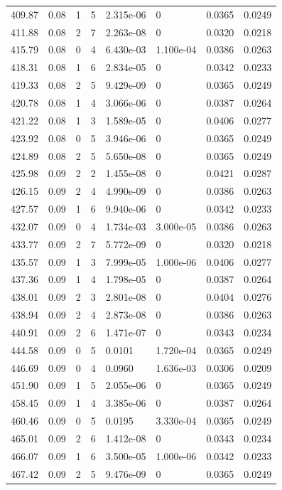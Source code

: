 \documentclass[preview]{standalone}
\begin{document}
{{{{{{\begin{tabular}{L{1.2cm}C{1.2cm} C{0.3cm}C{0.5cm} C{1.4cm}C{1.4cm} C{1.4cm}C{1.4cm}}
  409.87  &  0.08  & 1     &  5 &  2.315e-06  & 0  & 0.0365 &  0.0249   \\ 
  411.88  &  0.08  & 2     &  7 &  2.263e-08  & 0  & 0.0320 &  0.0218   \\ 
  415.79  &  0.08  & 0     &  4 &  6.430e-03  & 1.100e-04  & 0.0386 &  0.0263   \\ 
  418.31  &  0.08  & 1     &  6 &  2.834e-05  & 0  & 0.0342 &  0.0233   \\ 
  419.33  &  0.08  & 2     &  5 &  9.429e-09  & 0  & 0.0365 &  0.0249   \\ 
  420.78  &  0.08  & 1     &  4 &  3.066e-06  & 0  & 0.0387 &  0.0264   \\ 
  421.22  &  0.08  & 1     &  3 &  1.589e-05  & 0  & 0.0406 &  0.0277   \\ 
  423.92  &  0.08  & 0     &  5 &  3.946e-06  & 0  & 0.0365 &  0.0249   \\ 
  424.89  &  0.08  & 2     &  5 &  5.650e-08  & 0  & 0.0365 &  0.0249   \\ 
  425.98  &  0.09  & 2     &  2 &  1.455e-08  & 0  & 0.0421 &  0.0287   \\ 
  426.15  &  0.09  & 2     &  4 &  4.990e-09  & 0  & 0.0386 &  0.0263   \\ 
  427.57  &  0.09  & 1     &  6 &  9.940e-06  & 0  & 0.0342 &  0.0233   \\ 
  432.07  &  0.09  & 0     &  4 &  1.734e-03  & 3.000e-05  & 0.0386 &  0.0263   \\ 
  433.77  &  0.09  & 2     &  7 &  5.772e-09  & 0  & 0.0320 &  0.0218   \\ 
  435.57  &  0.09  & 1     &  3 &  7.999e-05  & 1.000e-06  & 0.0406 &  0.0277   \\ 
  437.36  &  0.09  & 1     &  4 &  1.798e-05  & 0  & 0.0387 &  0.0264   \\ 
  438.01  &  0.09  & 2     &  3 &  2.801e-08  & 0  & 0.0404 &  0.0276   \\ 
  438.94  &  0.09  & 2     &  4 &  2.873e-08  & 0  & 0.0386 &  0.0263   \\ 
  440.91  &  0.09  & 2     &  6 &  1.471e-07  & 0  & 0.0343 &  0.0234   \\ 
  444.58  &  0.09  & 0     &  5 &  0.0101  & 1.720e-04  & 0.0365 &  0.0249   \\ 
  446.69  &  0.09  & 0     &  4 &  0.0960  & 1.636e-03  & 0.0306 &  0.0209   \\ 
  451.90  &  0.09  & 1     &  5 &  2.055e-06  & 0  & 0.0365 &  0.0249   \\ 
  458.45  &  0.09  & 1     &  4 &  3.385e-06  & 0  & 0.0387 &  0.0264   \\ 
  460.46  &  0.09  & 0     &  5 &  0.0195  & 3.330e-04  & 0.0365 &  0.0249   \\ 
  465.01  &  0.09  & 2     &  6 &  1.412e-08  & 0  & 0.0343 &  0.0234   \\ 
  466.07  &  0.09  & 1     &  6 &  3.500e-05  & 1.000e-06  & 0.0342 &  0.0233   \\ 
  467.42  &  0.09  & 2     &  5 &  9.476e-09  & 0  & 0.0365 &  0.0249   \\ 
\hline 
\end{tabular} 

}}}}}}
\end{document}
